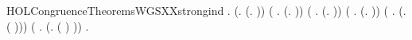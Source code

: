 \begin{SaveVerbatim}{HOLCongruenceTheoremsWGSXXstrongind}
\HOLTokenTurnstile{} \HOLSymConst{\HOLTokenForall{}}.
       (\HOLSymConst{\HOLTokenForall{}}.  (\HOLTokenLambda{}. )) \HOLSymConst{\HOLTokenConj{}}
       (\HOLSymConst{\HOLTokenForall{}} .   \HOLSymConst{\HOLTokenImp{}}  (\HOLTokenLambda{}.  )) \HOLSymConst{\HOLTokenConj{}}
       (\HOLSymConst{\HOLTokenForall{}}   .
              \HOLSymConst{\HOLTokenConj{}}   \HOLSymConst{\HOLTokenImp{}}
             (\HOLTokenLambda{}.   \HOLSymConst{\ensuremath{+}}  )) \HOLSymConst{\HOLTokenConj{}}
       (\HOLSymConst{\HOLTokenForall{}} .
              \HOLSymConst{\HOLTokenConj{}}   \HOLSymConst{\HOLTokenConj{}}   \HOLSymConst{\HOLTokenConj{}}   \HOLSymConst{\HOLTokenImp{}}
             (\HOLTokenLambda{}.   \HOLSymConst{\ensuremath{\parallel}}  )) \HOLSymConst{\HOLTokenConj{}}
       (\HOLSymConst{\HOLTokenForall{}} .   \HOLSymConst{\HOLTokenConj{}}   \HOLSymConst{\HOLTokenImp{}}  (\HOLTokenLambda{}. \HOLConst{\ensuremath{\nu}}  ( ))) \HOLSymConst{\HOLTokenConj{}}
       (\HOLSymConst{\HOLTokenForall{}} .   \HOLSymConst{\HOLTokenConj{}}   \HOLSymConst{\HOLTokenImp{}}  (\HOLTokenLambda{}.  ( ) )) \HOLSymConst{\HOLTokenImp{}}
       \HOLSymConst{\HOLTokenForall{}}.   \HOLSymConst{\HOLTokenImp{}}  
\end{SaveVerbatim}
